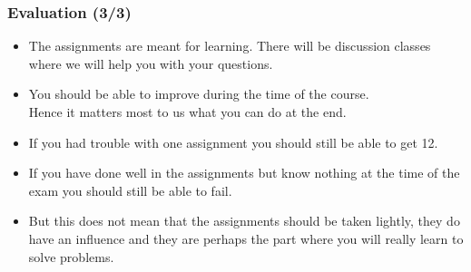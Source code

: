 \documentclass[handout,usepdftitle=false,aspectratio=169,smaller,compress,sans,fleqn,xcolor=dvipsnames,fleqn,table]{beamer}
\begin{document}


\begin{frame}%
  \frametitle{Evaluation (3/3)}
  
\begin{itemize}\itemsep=3ex
    \item The assignments are meant for learning. There will be
      discussion classes where we will help you with your questions.
    \item You should be able to improve during the time of the course.\\
Hence it matters most to us what you can do at the end.
\item If you had trouble with one assignment you should still be able to get 12.
\item If you have done well in the assignments but know nothing at the
  time of the exam you should still be able to fail.
\item But this does not mean that the assignments should be taken
  lightly, they do have an influence and they are perhaps the part where
  you will really learn to solve problems.
\end{itemize}
\end{frame}
\end{document}
